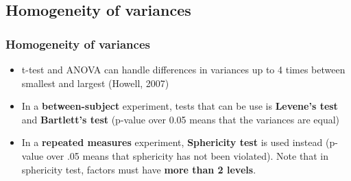 \documentclass{beamer}
\begin{document}
\subsection{Homogeneity of variances}

\begin{frame}
	\frametitle{Homogeneity of variances} 
	\begin{itemize}
		\item t-test and ANOVA can handle differences in variances up to 4 times between smallest and largest (Howell, 2007)
		\item In a \textbf{between-subject }experiment, tests that can be use is \textbf{Levene's test} and \textbf{Bartlett's test} (p-value over 0.05 means that the variances are equal)
		\item In a\textbf{ repeated measures} experiment, \textbf{Sphericity test} is used instead (p-value over .05 means that sphericity has not been violated).   Note that in sphericity test, factors must have \textbf{more than 2 levels}.
	\end{itemize}
\end{frame}
\end{document}
